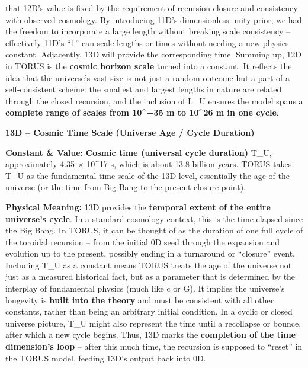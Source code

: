 \documentclass[
]{article}
\begin{document}
that 12D's value is fixed by the requirement of recursion closure and
consistency with observed cosmology\hspace{0pt}. By introducing 11D's
dimensionless unity prior, we had the freedom to incorporate a large
length without breaking scale consistency -- effectively 11D's ``1'' can
scale lengths or times without needing a new physics
constant\hspace{0pt}. Adjacently, 13D will provide the corresponding
time. Summing up, 12D in TORUS is the \textbf{cosmic horizon scale}
turned into a constant. It reflects the idea that the universe's vast
size is not just a random outcome but a part of a self-consistent
scheme: the smallest and largest lengths in nature are related through
the closed recursion, and the inclusion of L\_U ensures the model spans
a \textbf{complete range of scales from 10\^{}−35 m to 10\^{}26 m in one
cycle}.

\textbf{13D -- Cosmic Time Scale (Universe Age / Cycle Duration)}

\textbf{Constant \& Value:} \textbf{Cosmic time (universal cycle
duration)} T\_U, approximately 4.35 × 10\^{}17 s\hspace{0pt}, which is
about 13.8 billion years. TORUS takes T\_U as the fundamental time scale
of the 13D level, essentially the age of the universe (or the time from
Big Bang to the present closure point).

\textbf{Physical Meaning:} 13D provides the \textbf{temporal extent of
the entire universe's cycle}. In a standard cosmology context, this is
the time elapsed since the Big Bang. In TORUS, it can be thought of as
the duration of one full cycle of the toroidal recursion -- from the
initial 0D seed through the expansion and evolution up to the present,
possibly ending in a turnaround or ``closure'' event\hspace{0pt}.
Including T\_U as a constant means TORUS treats the age of the universe
not just as a measured historical fact, but as a parameter that is
determined by the interplay of fundamental physics (much like c or G).
It implies the universe's longevity is \textbf{built into the theory}
and must be consistent with all other constants, rather than being an
arbitrary initial condition\hspace{0pt}. In a cyclic or closed universe
picture, T\_U might also represent the time until a recollapse or
bounce, after which a new cycle begins. Thus, 13D marks the
\textbf{completion of the time dimension's loop} -- after this much
time, the recursion is supposed to ``reset'' in the TORUS model, feeding
13D's output back into 0D.
\end{document}
